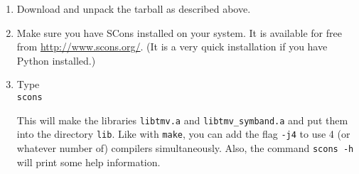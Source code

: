 \documentclass[twoside,letterpaper,11pt]{article}
\begin{document}
\begin{enumerate}
\item Download and unpack the tarball as described above.

\item Make sure you have SCons installed on your system.  
It is available for free from \url{http://www.scons.org/}.  (It is a
very quick installation if you have Python installed.)

\item Type \\
\texttt{scons}

This will make the libraries \texttt{libtmv.a} and \texttt{libtmv\_symband.a}
and put them into the directory \texttt{lib}.  Like with \texttt{make}, you can add
the flag \texttt{-j4} to use 4 (or whatever number of) compilers simultaneously.
Also, the command \texttt{scons -h} will print some help information.


\end{enumerate}
\end{document}
